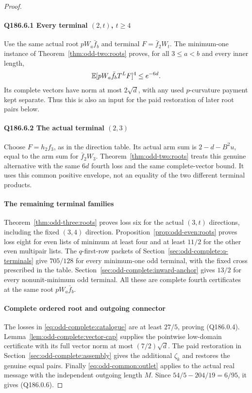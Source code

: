 \begin{proof}
\paragraph{Q186.6.1 Every terminal \((2,t)\), \(t\ge4\)}\label{part:Q186.6.1}
Use the same actual root \(pW_a\bar f_b\) and terminal
\(F=\bar f_2W_t\). The minimum-one instance of
Theorem~\ref{thm:odd-two:roots} proves, for all \(3\le a<b\)
and every inner length,
\begin{equation}\label{eq:odd186:terminal-two}
 \mathbb E[pW_a\bar f_bT^LF]^4\le e^{-6d}.
\end{equation}
Its complete vectors have norm at most \(2\sqrt d\), with any
used \(p\)-curvature payment kept separate. Thus this is also
an input for the paid restoration of later root pairs below.

\paragraph{Q186.6.2 The actual terminal \((2,3)\)}
Choose \(F=h_2f_3\), as in the direction table. Its actual arm
sum is \(2-d-B^2u\), equal to the arm sum for \(\bar f_2W_3\).
Theorem~\ref{thm:odd-two:roots} treats this genuine alternative
with the same \(6d\) fourth loss and the same complete-vector
bound. It uses this common positive envelope, not an equality of
the two different terminal products.

\paragraph{The remaining terminal families}
\label{part:Q186.7}\label{part:Q186.8}\label{part:Q186.9}
Theorem~\ref{thm:odd-three:roots} proves loss six for the actual
$(3,t)$ directions, including the fixed $(3,4)$ direction.
Proposition~\ref{prop:odd-even:roots} proves loss eight for even
lists of minimum at least four and at least $11/2$ for the other
even multipair lists. The $q$-first-row packets of
Section~\ref{sec:odd-complete:q-terminals} give $705/128$ for
every minimum-one odd terminal, with the fixed cross prescribed
in the table. Section~\ref{sec:odd-complete:inward-anchor} gives
$13/2$ for every nonunit-minimum odd terminal. All these are
complete fourth certificates at the same root $pW_a\bar f_b$.

\paragraph{Complete ordered root and outgoing connector}
\label{part:Q186.11}
The losses in \eqref{eq:odd-complete:catalogue} are at least
$27/5$, proving \textup{(Q186.0.4)}.
Lemma~\ref{lem:odd-complete:vector-cap} supplies the pointwise
low-domain certificate with its full vector norm at most
$(7/2)\sqrt d$. The paid restoration in
Section~\ref{sec:odd-complete:assembly} gives the additional
$\zeta_k$ and restores the genuine equal pairs.
Finally \eqref{eq:odd-common:outlet} applies to the actual real
message with the independent outgoing length $M$.
Since $54/5-204/19=6/95$, it gives \textup{(Q186.0.6)}.
\end{proof}

